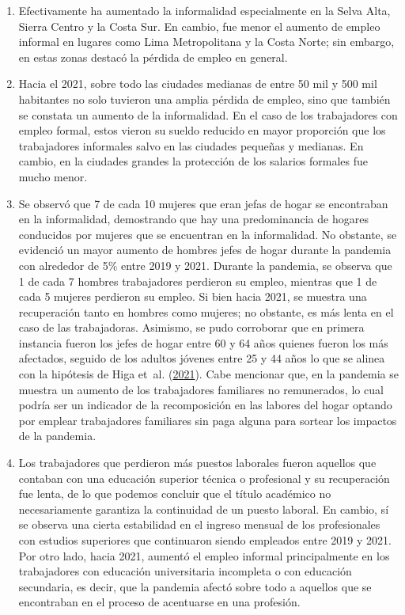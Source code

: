 \documentclass[
  letterpaper,
  12pt,
  oneside,
  spanish,
  doublespacing,
  headsepline,
  parskip]{MastersDoctoralThesis}
\begin{document}
\begin{enumerate}
\def\labelenumi{\Alph{enumi})}
\item
  Efectivamente ha aumentado la informalidad especialmente en la Selva
  Alta, Sierra Centro y la Costa Sur. En cambio, fue menor el aumento de
  empleo informal en lugares como Lima Metropolitana y la Costa Norte;
  sin embargo, en estas zonas destacó la pérdida de empleo en general.
\item
  Hacia el 2021, sobre todo las ciudades medianas de entre 50 mil y 500
  mil habitantes no solo tuvieron una amplia pérdida de empleo, sino que
  también se constata un aumento de la informalidad. En el caso de los
  trabajadores con empleo formal, estos vieron su sueldo reducido en
  mayor proporción que los trabajadores informales salvo en las ciudades
  pequeñas y medianas. En cambio, en la ciudades grandes la protección
  de los salarios formales fue mucho menor.
\item
  Se observó que 7 de cada 10 mujeres que eran jefas de hogar se
  encontraban en la informalidad, demostrando que hay una predominancia
  de hogares conducidos por mujeres que se encuentran en la
  informalidad. No obstante, se evidenció un mayor aumento de hombres
  jefes de hogar durante la pandemia con alrededor de 5\% entre 2019 y
  2021. Durante la pandemia, se observa que 1 de cada 7 hombres
  trabajadores perdieron su empleo, mientras que 1 de cada 5 mujeres
  perdieron su empleo. Si bien hacia 2021, se muestra una recuperación
  tanto en hombres como mujeres; no obstante, es más lenta en el caso de
  las trabajadoras. Asimismo, se pudo corroborar que en primera
  instancia fueron los jefes de hogar entre 60 y 64 años quienes fueron
  los más afectados, seguido de los adultos jóvenes entre 25 y 44 años
  lo que se alinea con la hipótesis de Higa et~al.
  (\protect\hyperlink{ref-higa2021}{2021}). Cabe mencionar que, en la
  pandemia se muestra un aumento de los trabajadores familiares no
  remunerados, lo cual podría ser un indicador de la recomposición en
  las labores del hogar optando por emplear trabajadores familiares sin
  paga alguna para sortear los impactos de la pandemia.
\item
  Los trabajadores que perdieron más puestos laborales fueron aquellos
  que contaban con una educación superior técnica o profesional y su
  recuperación fue lenta, de lo que podemos concluir que el título
  académico no necesariamente garantiza la continuidad de un puesto
  laboral. En cambio, sí se observa una cierta estabilidad en el ingreso
  mensual de los profesionales con estudios superiores que continuaron
  siendo empleados entre 2019 y 2021. Por otro lado, hacia 2021, aumentó
  el empleo informal principalmente en los trabajadores con educación
  universitaria incompleta o con educación secundaria, es decir, que la
  pandemia afectó sobre todo a aquellos que se encontraban en el proceso
  de acentuarse en una profesión.
\end{enumerate}
\end{document}
